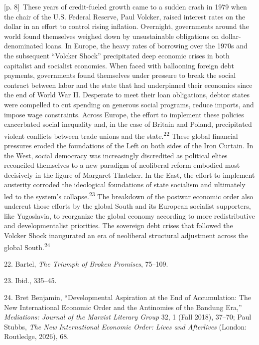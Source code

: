 \documentclass[10pt,a4paper]{article}
\begin{document}
{\scriptsize\color{gray} [p. 8]}\ These years of credit-fueled growth came to a sudden crash in 1979 when the chair of the U.S. Federal Reserve, Paul Volcker, raised interest rates on the dollar in an effort to control rising inflation. Overnight, governments around the world found themselves weighed down by unsustainable obligations on dollar-denominated loans. In Europe, the heavy rates of borrowing over the 1970s and the subsequent “Volcker Shock” precipitated deep economic crises in both capitalist and socialist economies. When faced with ballooning foreign debt payments, governments found themselves under pressure to break the social contract between labor and the state that had underpinned their economies since the end of World War II. Desperate to meet their loan obligations, debtor states were compelled to cut spending on generous social programs, reduce imports, and impose wage constraints. Across Europe, the effort to implement these policies exacerbated social inequality and, in the case of Britain and Poland, precipitated violent conflicts between trade unions and the state.\nobreak\textsuperscript{22} These global financial pressures eroded the foundations of the Left on both sides of the Iron Curtain. In the West, social democracy was increasingly discredited as political elites reconciled themselves to a new paradigm of neoliberal reform embodied most decisively in the figure of Margaret Thatcher. In the East, the effort to implement austerity corroded the ideological foundations of state socialism and ultimately led to the system’s collapse.\nobreak\textsuperscript{23} The breakdown of the postwar economic order also undercut those efforts by the global South and its European socialist supporters, like Yugoslavia, to reorganize the global economy according to more redistributive and developmentalist priorities. The sovereign debt crises that followed the Volcker Shock inaugurated an era of neoliberal structural adjustment across the global South.\nobreak\textsuperscript{24}\par{\small 22. Bartel, \textit{The Triumph of Broken Promises}, 75–109.\par}{\small 23. Ibid., 335–45.\par}{\small 24. Bret Benjamin, “Developmental Aspiration at the End of Accumulation: The New International Economic Order and the Antinomies of the Bandung Era,” \textit{Mediations: Journal of the Marxist Literary Group} 32, 1 (Fall 2018), 37–70; Paul Stubbs, \textit{The New International Economic Order: Lives and Afterlives} (London: Routledge, 2026), 68.\par}
\end{document}
